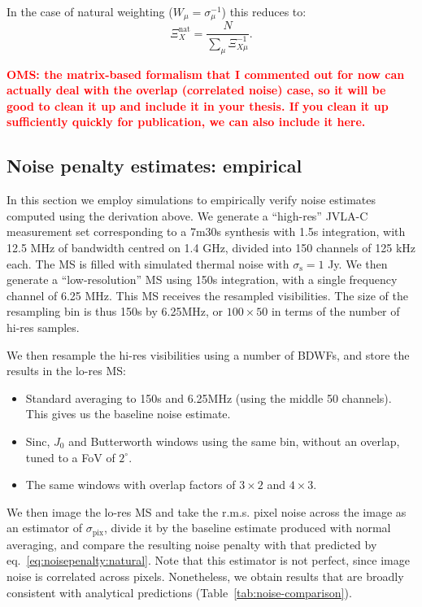 \documentclass[useAMS,usenatbib]{mn2e}
\newcommand{\OMS}[1]{\textcolor{red}{{\bf OMS: #1}}}
\begin{document}
In the case of natural weighting ($W_\mu=\sigma_\mu^{-1}$) this reduces to:
\begin{equation}
\label{eq:noisepenalty:natural}
\Xi_X^{\mathrm{nat}} = \frac{N}{ \sum_{\mu} \Xi_{X\mu}^{-1} }.
\end{equation}

\OMS{the matrix-based formalism that I commented out for now can actually deal with the overlap (correlated noise) 
case, so it will be good to clean it up and include it in your thesis. If you clean it up sufficiently quickly for
publication, we can also include it here.}

\subsection{Noise penalty estimates: empirical}

\label{subsec:noise}
In this section we employ simulations to empirically verify noise estimates computed using the derivation 
above. We generate a ``high-res''
JVLA-C measurement set corresponding to a 7m30s synthesis with 1.5s integration, with 12.5 MHz of bandwidth
centred on 1.4 GHz, divided into 150 channels of 125 kHz each. The MS is filled with simulated thermal noise 
with $\sigma_\mathrm{s}=1$ Jy. We then generate a ``low-resolution'' MS using 150s integration, with 
a single frequency channel of 6.25 MHz. This MS receives the resampled visibilities. 
The size of the resampling bin is thus 150s by 6.25MHz, or $100\times50$ in terms of the number of hi-res samples.

We then resample the hi-res visibilities using a number of BDWFs, and store the results in the lo-res MS:

\begin{itemize}
\item Standard averaging to 150s and 6.25MHz (using the middle 50 channels). This gives us the baseline noise
estimate.
\item Sinc, $J_0$ and Butterworth windows using the same bin, without an overlap, tuned to a FoV of $2^\circ$.
\item The same windows with overlap factors of $3\times2$ and $4\times3$.
\end{itemize}

We then image the lo-res MS and take the r.m.s. pixel noise across the image as an estimator of $\sigma_\mathrm{pix}$,
divide it by the baseline estimate produced with normal averaging, and compare the resulting noise penalty with that
predicted by eq.~\ref{eq:noisepenalty:natural}. Note that this estimator is not perfect, since image noise is correlated
across pixels. Nonetheless, we obtain results that are broadly consistent with analytical predictions 
(Table~\ref{tab:noise-comparison}).
\end{document}
